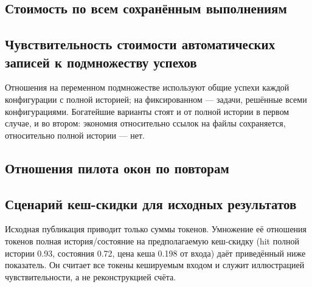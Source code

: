 \subsection{Стоимость по всем сохранённым выполнениям}
\label{app:efficiency}
\begin{table}[htbp]
\centering\small
\caption{Стоимость и эффективность с учётом неудач. Медиана и среднее
стоимости отвечают на иные вопросы, чем суммарная стоимость на успех;
ни одна величина не оценивает стоимость повторов до успеха.}
\label{tab:economics}
\resizebox{\linewidth}{!}{}
\end{table}

\subsection{Чувствительность стоимости автоматических записей к подмножеству успехов}
\label{app:composition}
Отношения на переменном подмножестве используют общие успехи каждой
конфигурации с полной историей; на фиксированном --- задачи, решённые
всеми конфигурациями. Богатейшие варианты стоят
\ExploreRichVariableCostRatio{} и \ExploreFailuresVariableCostRatio{}
от полной истории в первом случае, \ExploreRichFixedCostRatio{}
и \ExploreFailuresFixedCostRatio{} во втором: экономия относительно
ссылок на файлы сохраняется, относительно полной истории --- нет.
\begin{table}[htbp]
\centering\small
\caption{Чувствительность стоимости автоматических записей. Значения ---
медианы отношений к полной истории внутри задачи.}
\label{tab:composition-sensitivity}

\end{table}

\subsection{Отношения пилота окон по повторам}
\label{app:window}
\begin{table}[htbp]
\centering\small
\caption{Пилот окон: медианные отношения стоимости и пикового промпта
к полной истории в том же повторе, отдельно для каждого повтора.}
\label{tab:window-repeats}
\resizebox{\linewidth}{!}{}
\end{table}

\subsection{Сценарий кеш-скидки для исходных результатов}
\label{app:pricing}
Исходная публикация приводит только суммы токенов. Умножение её отношения
токенов полная история/состояние на предполагаемую кеш-скидку (hit полной
истории 0.93, состояния 0.72, цена кеша 0.198 от входа) даёт приведённый
ниже показатель. Он считает все токены кешируемым входом и служит
иллюстрацией чувствительности, а не реконструкцией счёта.
\begin{table}[htbp]
\centering\small
\caption{Опубликованное отношение токенов полная история/состояние
и показатель с учётом скидки по горизонту событий. Значения больше единицы
благоприятны для состояния.}
\label{tab:pricing}

\end{table}
